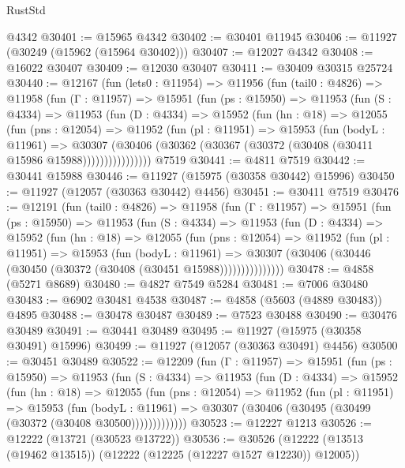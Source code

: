 \begin{lexlean}{RustStd}
\begin{coremodule}
    @4342
@30401 := @15965 @4342
@30402 := @30401 @11945
@30406 := @11927 (@30249 (@15962 (@15964 @30402)))
@30407 := @12027 @4342
@30408 := @16022 @30407
@30409 := @12030 @30407
@30411 := @30409 @30315 @25724
@30440 := @12167
    (fun (lets0 : @11954) =>
    @11956
      (fun (tail0 : @4826) =>
      @11958
        (fun (Γ : @11957) =>
        @15951
          (fun (ps : @15950) =>
          @11953
            (fun (S : @4334) =>
            @11953
              (fun (D : @4334) =>
              @15952
                (fun (hn : @18) =>
                @12055
                  (fun (pns : @12054) =>
                  @11952
                    (fun (pl : @11951) =>
                    @15953
                      (fun (bodyL : @11961) =>
                      @30307
                        (@30406
                          (@30362 (@30367 (@30372 (@30408 (@30411 @15986 @15988))))))))))))))))
    @7519
@30441 := @4811 @7519
@30442 := @30441 @15988
@30446 := @11927 (@15975 (@30358 @30442) @15996)
@30450 := @11927 (@12057 (@30363 @30442) @4456)
@30451 := @30411 @7519
@30476 := @12191
    (fun (tail0 : @4826) =>
    @11958
      (fun (Γ : @11957) =>
      @15951
        (fun (ps : @15950) =>
        @11953
          (fun (S : @4334) =>
          @11953
            (fun (D : @4334) =>
            @15952
              (fun (hn : @18) =>
              @12055
                (fun (pns : @12054) =>
                @11952
                  (fun (pl : @11951) =>
                  @15953
                    (fun (bodyL : @11961) =>
                    @30307 (@30406 (@30446 (@30450 (@30372 (@30408 (@30451 @15988)))))))))))))))
@30478 := @4858 (@5271 @8689)
@30480 := @4827 @7549 @5284
@30481 := @7006 @30480
@30483 := @6902 @30481 @4538
@30487 := @4858 (@5603 (@4889 @30483)) @4895
@30488 := @30478 @30487
@30489 := @7523 @30488
@30490 := @30476 @30489
@30491 := @30441 @30489
@30495 := @11927 (@15975 (@30358 @30491) @15996)
@30499 := @11927 (@12057 (@30363 @30491) @4456)
@30500 := @30451 @30489
@30522 := @12209
    (fun (Γ : @11957) =>
    @15951
      (fun (ps : @15950) =>
      @11953
        (fun (S : @4334) =>
        @11953
          (fun (D : @4334) =>
          @15952
            (fun (hn : @18) =>
            @12055
              (fun (pns : @12054) =>
              @11952
                (fun (pl : @11951) =>
                @15953
                  (fun (bodyL : @11961) =>
                  @30307 (@30406 (@30495 (@30499 (@30372 (@30408 @30500)))))))))))))
@30523 := @12227 @1213
@30526 := @12222 (@13721 (@30523 @13722))
@30536 := @30526 (@12222 (@13513 (@19462 @13515)) (@12222 (@12225 (@12227 @1527 @12230)) @12005))

\end{coremodule}
\end{lexlean}
